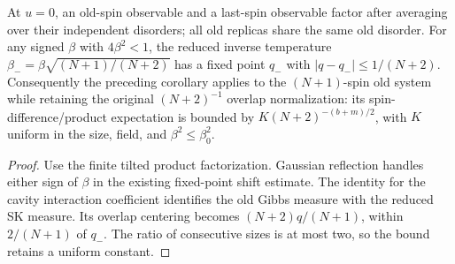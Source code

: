 \begin{lemma}\label{lem:sg-tal:hanen-reduced-system}
\leanok
{}
At $u=0$, an old-spin observable and a last-spin observable factor after averaging over
their independent disorders; all old replicas share the same old disorder.
For any signed $\beta$ with $4\beta^2<1$, the reduced inverse temperature
$\beta_- = \beta\sqrt{(N+1)/(N+2)}$ has a fixed point $q_-$ with
$|q-q_-|\le1/(N+2)$. Consequently the preceding corollary applies to the
$(N+1)$-spin old system while retaining the original $(N+2)^{-1}$ overlap normalization:
its spin-difference/product expectation is bounded by $K(N+2)^{-(b+m)/2}$,
with $K$ uniform in the size, field, and $\beta^2\le\beta_0^2$.
\end{lemma}
\begin{proof}
\leanok
Use the finite tilted product factorization. Gaussian reflection handles either sign of
$\beta$ in the existing fixed-point shift estimate. The identity for the cavity interaction
coefficient identifies the old Gibbs measure with the reduced SK measure.
Its overlap centering becomes $(N+2)q/(N+1)$, within $2/(N+1)$ of $q_-$.
The ratio of consecutive sizes is at most two, so the bound retains a uniform constant.
\end{proof}

